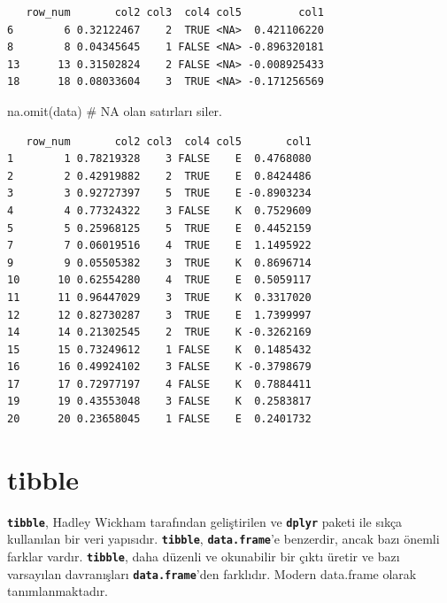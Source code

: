 \documentclass[
  letterpaper,
  DIV=11,
  numbers=noendperiod]{scrreprt}
\newenvironment{Shaded}{\begin{snugshade}}{\end{snugshade}}
\newcommand{\CommentTok}[1]{\textcolor[rgb]{0.37,0.37,0.37}{#1}}
\newcommand{\FunctionTok}[1]{\textcolor[rgb]{0.28,0.35,0.67}{#1}}
\newcommand{\NormalTok}[1]{\textcolor[rgb]{0.00,0.23,0.31}{#1}}
\begin{document}
\begin{verbatim}
   row_num       col2 col3  col4 col5         col1
6        6 0.32122467    2  TRUE <NA>  0.421106220
8        8 0.04345645    1 FALSE <NA> -0.896320181
13      13 0.31502824    2 FALSE <NA> -0.008925433
18      18 0.08033604    3  TRUE <NA> -0.171256569
\end{verbatim}

\begin{Shaded}
\begin{Highlighting}[]
\FunctionTok{na.omit}\NormalTok{(data) }\CommentTok{\# NA olan satırları siler.}
\end{Highlighting}
\end{Shaded}

\begin{verbatim}
   row_num       col2 col3  col4 col5       col1
1        1 0.78219328    3 FALSE    E  0.4768080
2        2 0.42919882    2  TRUE    E  0.8424486
3        3 0.92727397    5  TRUE    E -0.8903234
4        4 0.77324322    3 FALSE    K  0.7529609
5        5 0.25968125    5  TRUE    E  0.4452159
7        7 0.06019516    4  TRUE    E  1.1495922
9        9 0.05505382    3  TRUE    K  0.8696714
10      10 0.62554280    4  TRUE    E  0.5059117
11      11 0.96447029    3  TRUE    K  0.3317020
12      12 0.82730287    3  TRUE    E  1.7399997
14      14 0.21302545    2  TRUE    K -0.3262169
15      15 0.73249612    1 FALSE    K  0.1485432
16      16 0.49924102    3 FALSE    K -0.3798679
17      17 0.72977197    4 FALSE    K  0.7884411
19      19 0.43553048    3 FALSE    K  0.2583817
20      20 0.23658045    1 FALSE    E  0.2401732
\end{verbatim}

\hypertarget{tibble}{%
\section{tibble}\label{tibble}}

\textbf{\texttt{tibble}}, Hadley Wickham tarafından geliştirilen ve
\textbf{\texttt{dplyr}} paketi ile sıkça kullanılan bir veri yapısıdır.
\textbf{\texttt{tibble}}, \textbf{\texttt{data.frame}}'e benzerdir,
ancak bazı önemli farklar vardır. \textbf{\texttt{tibble}}, daha düzenli
ve okunabilir bir çıktı üretir ve bazı varsayılan davranışları
\textbf{\texttt{data.frame}}'den farklıdır. Modern data.frame olarak
tanımlanmaktadır.
\end{document}
